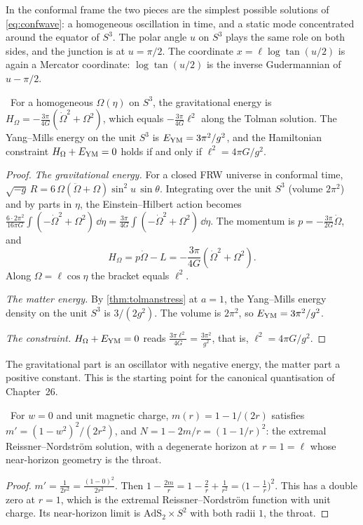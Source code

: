 In the conformal frame the two pieces are the simplest possible solutions of \eqref{eq:confwave}: a homogeneous oscillation in time, and a static mode concentrated around the equator of $S^3$. The polar angle $u$ on $S^3$ plays the same role on both sides, and the junction is at $u=\pi/2$. The coordinate $x=\ell\log\tan(u/2)$ is again a Mercator coordinate: $\log\tan(u/2)$ is the inverse Gudermannian of $u-\pi/2$.

\begin{proposition}\label{prop:minisuper}\ver\
For a homogeneous $\Omega(\eta)$ on $S^3$, the gravitational energy is $H_\Omega=-\frac{3\pi}{4G}(\dot\Omega^2+\Omega^2)$, which equals $-\frac{3\pi}{4G}\ell^2$ along the Tolman solution. The Yang--Mills energy on the unit $S^3$ is $E_{\rm YM}=3\pi^2/g^2$, and the Hamiltonian constraint $H_\Omega+E_{\rm YM}=0$ holds if and only if $\ell^2=4\pi G/g^2$.
\end{proposition}
\begin{proof}
\emph{The gravitational energy.} For a closed FRW universe in conformal time, $\sqrt{-g}\,R=6\,\Omega(\ddot\Omega+\Omega)\sin^2\!u\,\sin\theta$. Integrating over the unit $S^3$ (volume $2\pi^2$) and by parts in $\eta$, the Einstein--Hilbert action becomes $\frac{6\cdot2\pi^2}{16\pi G}\int(-\dot\Omega^2+\Omega^2)\,\dd\eta=\frac{3\pi}{4G}\int(-\dot\Omega^2+\Omega^2)\,\dd\eta$. The momentum is $p=-\frac{3\pi}{2G}\dot\Omega$, and
\[
H_\Omega=p\dot\Omega-L=-\frac{3\pi}{4G}(\dot\Omega^2+\Omega^2).
\]
Along $\Omega=\ell\cos\eta$ the bracket equals $\ell^2$.

\emph{The matter energy.} By \cref{thm:tolmanstress} at $a=1$, the Yang--Mills energy density on the unit $S^3$ is $3/(2g^2)$. The volume is $2\pi^2$, so $E_{\rm YM}=3\pi^2/g^2$.

\emph{The constraint.} $H_\Omega+E_{\rm YM}=0$ reads $\frac{3\pi\ell^2}{4G}=\frac{3\pi^2}{g^2}$, that is, $\ell^2=4\pi G/g^2$.
\end{proof}


The gravitational part is an oscillator with negative energy, the matter part a positive constant. This is the starting point for the canonical quantisation of Chapter~26.

\begin{proposition}[Where smooth static solutions go]\label{prop:extremallimit}\ver\
For $w=0$ and unit magnetic charge, $m(r)=1-1/(2r)$ satisfies $m'=(1-w^2)^2/(2r^2)$, and $N=1-2m/r=(1-1/r)^2$: the extremal Reissner--Nordstr\"om solution, with a degenerate horizon at $r=1=\ell$ whose near-horizon geometry is the throat.
\end{proposition}
\begin{proof}
$m'=\frac1{2r^2}=\frac{(1-0)^2}{2r^2}$. Then $1-\frac{2m}r=1-\frac2r+\frac1{r^2}=\bigl(1-\frac1r\bigr)^2$. This has a double zero at $r=1$, which is the extremal Reissner--Nordstr\"om function with unit charge. Its near-horizon limit is $\mathrm{AdS}_2\times S^2$ with both radii $1$, the throat.
\end{proof}


